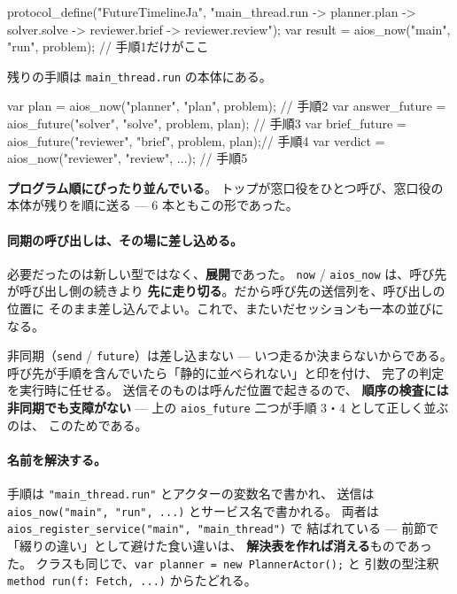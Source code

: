\documentclass[11pt,a4paper]{ltjsarticle}
\theoremstyle{definition}
\theoremstyle{remark}
\begin{document}
\begin{aipl}
protocol_define("FutureTimelineJa",
  "main_thread.run -> planner.plan -> solver.solve
   -> reviewer.brief -> reviewer.review");
var result = aios_now("main", "run", problem);      // 手順1だけがここ
\end{aipl}

残りの手順は \texttt{main\_thread.run} の本体にある。

\begin{aipl}
var plan          = aios_now("planner", "plan", problem);          // 手順2
var answer_future = aios_future("solver", "solve", problem, plan);  // 手順3
var brief_future  = aios_future("reviewer", "brief", problem, plan);// 手順4
var verdict       = aios_now("reviewer", "review", ...);            // 手順5
\end{aipl}

\textbf{プログラム順にぴったり並んでいる}。
トップが窓口役をひとつ呼び、窓口役の本体が残りを順に送る ---
6 本ともこの形であった。

\paragraph{同期の呼び出しは、その場に差し込める。}
必要だったのは新しい型ではなく、\textbf{展開}であった。
\texttt{now} / \texttt{aios\_now} は、呼び先が呼び出し側の続きより
\textbf{先に走り切る}。だから呼び先の送信列を、呼び出しの位置に
そのまま差し込んでよい。これで、またいだセッションも一本の並びになる。

非同期（\texttt{send} / \texttt{future}）は差し込まない ---
いつ走るか決まらないからである。
呼び先が手順を含んでいたら「静的に並べられない」と印を付け、
完了の判定を実行時に任せる。
送信そのものは呼んだ位置で起きるので、
\textbf{順序の検査には非同期でも支障がない} ---
上の \texttt{aios\_future} 二つが手順 3・4 として正しく並ぶのは、
このためである。

\paragraph{名前を解決する。}
手順は \texttt{"main\_thread.run"} とアクターの変数名で書かれ、
送信は \texttt{aios\_now("main", "run", ...)} とサービス名で書かれる。
両者は \texttt{aios\_register\_service("main", "main\_thread")} で
結ばれている --- 前節で「綴りの違い」として避けた食い違いは、
\textbf{解決表を作れば消える}ものであった。
クラスも同じで、\texttt{var planner = new PlannerActor();} と
引数の型注釈 \texttt{method run(f: Fetch, ...)} からたどれる。
\end{document}
